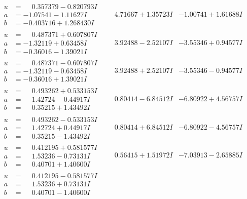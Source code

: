 \documentclass[1p]{elsarticle_modified}
\theoremstyle{definition}
\begin{document}
$$\begin{array}{c|c|c}
\begin{aligned}
u &= \phantom{-}0.357379 - 0.820793 I \\
a &= -1.07541 - 1.11627 I \\
b &= -0.403716 + 1.268430 I\end{aligned}
 & \phantom{-}4.71667 + 1.35723 I & -1.00741 + 1.61688 I \\ \hline\begin{aligned}
u &= \phantom{-}0.487371 + 0.607807 I \\
a &= -1.32119 + 0.63458 I \\
b &= -0.36016 - 1.39021 I\end{aligned}
 & \phantom{-}3.92488 - 2.52107 I & -3.55346 + 0.94577 I \\ \hline\begin{aligned}
u &= \phantom{-}0.487371 - 0.607807 I \\
a &= -1.32119 - 0.63458 I \\
b &= -0.36016 + 1.39021 I\end{aligned}
 & \phantom{-}3.92488 + 2.52107 I & -3.55346 - 0.94577 I \\ \hline\begin{aligned}
u &= \phantom{-}0.493262 + 0.533153 I \\
a &= \phantom{-}1.42724 - 0.44917 I \\
b &= \phantom{-}0.35215 + 1.43492 I\end{aligned}
 & \phantom{-}0.80414 - 6.84512 I & -6.80922 + 4.56757 I \\ \hline\begin{aligned}
u &= \phantom{-}0.493262 - 0.533153 I \\
a &= \phantom{-}1.42724 + 0.44917 I \\
b &= \phantom{-}0.35215 - 1.43492 I\end{aligned}
 & \phantom{-}0.80414 + 6.84512 I & -6.80922 - 4.56757 I \\ \hline\begin{aligned}
u &= \phantom{-}0.412195 + 0.581577 I \\
a &= \phantom{-}1.53236 - 0.73131 I \\
b &= \phantom{-}0.40701 + 1.40600 I\end{aligned}
 & \phantom{-}0.56415 + 1.51972 I & -7.03913 - 2.65885 I \\ \hline\begin{aligned}
u &= \phantom{-}0.412195 - 0.581577 I \\
a &= \phantom{-}1.53236 + 0.73131 I \\
b &= \phantom{-}0.40701 - 1.40600 I\end{aligned}

\end{array}$$
\end{document}
